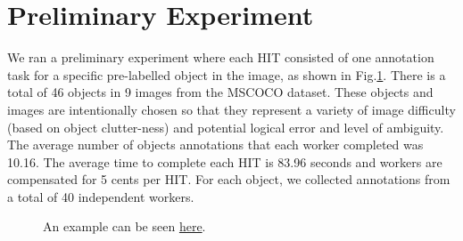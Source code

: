\documentclass[12pt]{article}
\begin{document}
\section{Preliminary Experiment}
We ran a preliminary experiment where each HIT consisted of one annotation task for a specific pre-labelled object in the image, as shown in Fig.\ref{interface}. There is a total of 46 objects in 9 images from the MSCOCO dataset\cite{Lin2014}. These objects and images are intentionally chosen so that they represent a variety of image difficulty (based on object clutter-ness) and potential logical error and level of ambiguity. The average number of objects annotations that each worker completed was 10.16. The average time to complete each HIT is 83.96 seconds and workers are compensated for 5 cents per HIT.  For each object, we collected annotations from a total of 40 independent workers.
\begin{figure}[ht]
\centering
{}
\caption{An example can be seen  \href{http://crowd-segment.herokuapp.com/segment/COCO_train2014_000000000127/10/}{here}.}
\label{interface}
\end{figure}
\end{document}
